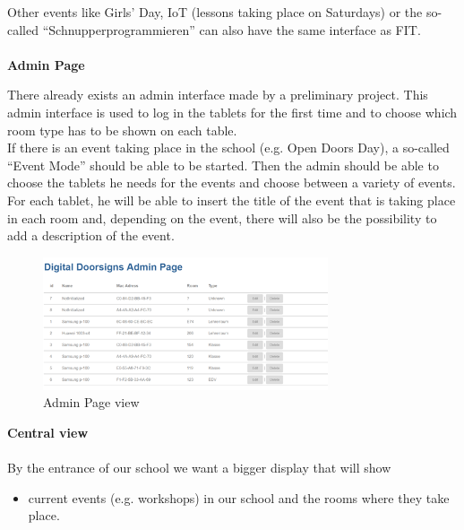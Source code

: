 \documentclass{article}
\newenvironment{explanation}{%
   \color{black}
}{}
\begin{document}
\begin{explanation}
Other events like Girls’ Day, IoT (lessons taking place on Saturdays) or the so-called “Schnupperprogrammieren” can also have the same interface as FIT. \\
\\

\textbf{Admin Page}

There already exists an admin interface made by a preliminary project. This admin interface is used to log in the tablets for the first time and to choose which room type has to be shown on each table. \\
If there is an event taking place in the school (e.g. Open Doors Day), a so-called “Event Mode” should be able to be started. Then the admin should be able to choose the tablets he needs for the events and choose between a variety of events. For each tablet, he will be able to insert the title of the event that is taking place in each room and, depending on the event, there will also be the possibility to add a description of the event.

\begin{figure}
    \centering
    \includegraphics[width=0.75\textwidth]{images/views_examples/adminpage.png}
    \caption{Admin Page view}
\end{figure}

\vspace{0.5cm}
\textbf{Central view} \\
\\
By the entrance of our school we want a bigger display that will show
\begin{itemize}
\item current events (e.g. workshops) in our school and the rooms where they take place.
\end{itemize}
\end{explanation}
\end{document}
